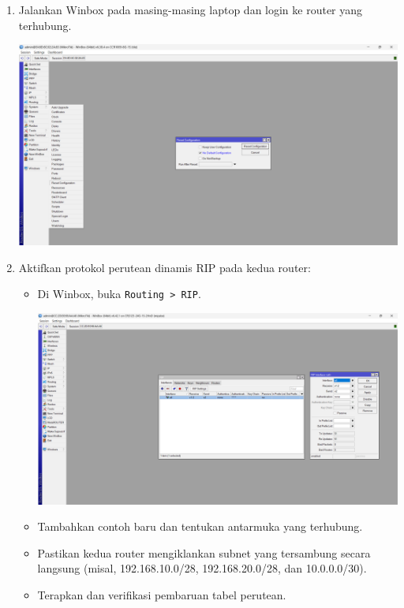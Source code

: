 \begin{enumerate}
\begin{enumerate}
\begin{center}
        \end{center}
        \item Jalankan Winbox pada masing-masing laptop dan login ke router yang terhubung.
        \begin{center}
		    \includegraphics[scale=0.17]{P1/img/1-11.png}
        \end{center}
        \item Aktifkan protokol perutean dinamis RIP pada kedua router:
        \begin{itemize}
            \item Di Winbox, buka \texttt{Routing > RIP}.
            \begin{center}
                \includegraphics[scale=0.17]{P1/img/1-12.png}
            \end{center}
            \item Tambahkan contoh baru dan tentukan antarmuka yang terhubung.
            \item Pastikan kedua router mengiklankan subnet yang tersambung secara langsung (misal, 192.168.10.0/28, 192.168.20.0/28, dan 10.0.0.0/30).
            \item Terapkan dan verifikasi pembaruan tabel perutean.

\end{itemize}
\end{enumerate}
\end{enumerate}
